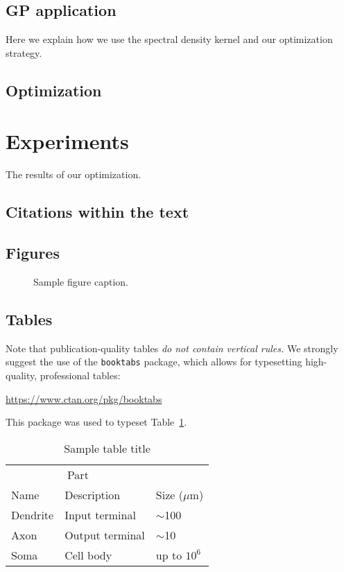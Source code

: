 \documentclass{article}
\begin{document}
\subsection{GP application}

Here we explain how we use the spectral density kernel and our optimization strategy.

\subsection{Optimization}

\section{Experiments}
\label{exper}

The results of our optimization.

\subsection{Citations within the text}

\subsection{Figures}

\begin{figure}[h]
  \centering
  \fbox{\rule[-.5cm]{0cm}{4cm} \rule[-.5cm]{4cm}{0cm}}
  \caption{Sample figure caption.}
\end{figure}

\subsection{Tables}

Note that publication-quality tables \emph{do not contain vertical
  rules.} We strongly suggest the use of the \verb+booktabs+ package,
which allows for typesetting high-quality, professional tables:
\begin{center}
  \url{https://www.ctan.org/pkg/booktabs}
\end{center}
This package was used to typeset Table~\ref{sample-table}.

\begin{table}[t]
  \caption{Sample table title}
  \label{sample-table}
  \centering
  \begin{tabular}{lll}
    \toprule
    \multicolumn{2}{c}{Part}                   \\
    \cmidrule{1-2}
    Name     & Description     & Size ($\mu$m) \\
    \midrule
    Dendrite & Input terminal  & $\sim$100     \\
    Axon     & Output terminal & $\sim$10      \\
    Soma     & Cell body       & up to $10^6$  \\
    \bottomrule
  \end{tabular}
\end{table}
\end{document}
